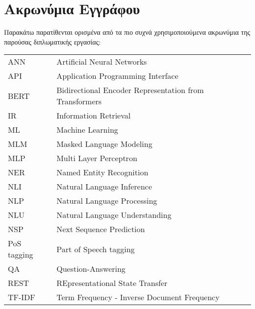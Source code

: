 \chapter*{Ακρωνύμια Εγγράφου}
\label{append:acronyms}
{}

Παρακάτω παρατίθενται ορισμένα από τα πιο συχνά χρησιμοποιούμενα ακρωνύμια της
παρούσας διπλωματικής εργασίας:

\begin{table}[htpb]
    \centering
    \begin{tabular}{l@{$\;\;\longrightarrow\;\;$}l}
        ANN & Artificial Neural Networks\\
        API & Application Programming Interface\\
        BERT & Bidirectional Encoder Representation from Transformers\\
        IR & Information Retrieval\\
        ML & Machine Learning\\
        MLM & Masked Language Modeling\\
        MLP & Multi Layer Perceptron\\
        NER & Named Entity Recognition\\
        NLI & Natural Language Inference\\
        NLP & Natural Language Processing\\
        NLU & Natural Language Understanding\\
        NSP & Next Sequence Prediction\\
        PoS tagging & Part of Speech tagging\\
        QA & Question-Answering\\
        REST & REpresentational State Transfer\\
        TF-IDF & Term Frequency - Inverse Document Frequency
    \end{tabular}
\end{table}
